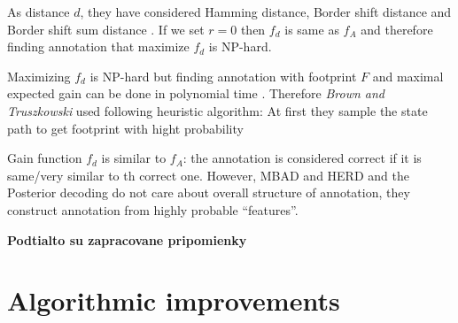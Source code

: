 As distance $d$, they have considered Hamming distance, Border shift distance
and Border shift sum distance \cite{Brown2010}.  If we set $r=0$ then $f_d$ is
same as $f_A$ and therefore finding annotation that maximize $f_d$ is NP-hard.

Maximizing $f_d$ is NP-hard but finding annotation with footprint $F$ and
maximal expected gain can be done in polynomial time \cite{Brown2010}. Therefore
{\it Brown and Truszkowski} used following heuristic algorithm: At first they
sample the state path to get footprint with hight probability

Gain function $f_d$ is similar to $f_A$: the annotation is considered correct if
it is same/very similar to th correct one. However, MBAD and HERD and the
Posterior decoding do not care about overall structure of annotation, they
construct annotation from highly probable ``features''.







\bigskip
{\large\bf Podtialto su zapracovane pripomienky}
\bigskip


\section{Algorithmic improvements}












